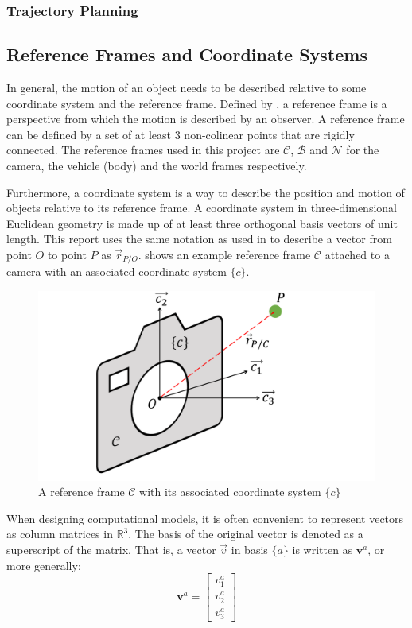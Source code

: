 \documentclass{UoNMCHA}
\numberwithin{equation}{section}
\begin{document}
\subsubsection{Trajectory Planning}

\subsection{Reference Frames and Coordinate Systems}\label{sec:ReferenceFrames}
In general, the motion of an object needs to be described relative to some coordinate system and the reference frame. Defined by \cite{3900Notes}, a reference frame is a perspective from which the motion is described by an observer. A reference frame can be defined by a set of at least 3 non-colinear points that are rigidly connected. The reference frames used in this project are $\mathcal{C}$, $\mathcal{B}$ and $\mathcal{N}$ for the camera, the vehicle (body) and the world frames respectively.

Furthermore, a coordinate system is a way to describe the position and motion of objects relative to its reference frame. A coordinate system in three-dimensional Euclidean geometry is made up of at least three orthogonal basis vectors of unit length. This report uses the same notation as used in \cite{3900Notes} to describe a vector from point $O$ to point $P$ as $\vec{r}_{P/O}$.  shows an example reference frame $\mathcal{C}$ attached to a camera with an associated coordinate system $\{c\}$.

\begin{figure}[ht]
    \begin{center}
        \includegraphics[width=.6\linewidth]{Figures/ReferenceFrame}
        \caption{A reference frame $\mathcal{C}$ with its associated coordinate system $\{c\}$}
        \label{fig:ReferenceFrame}
    \end{center}
\end{figure}

When designing computational models, it is often convenient to represent vectors as column matrices in $\mathbb{R}^3$. The basis of the original vector is denoted as a superscript of the matrix. That is, a vector $\vec{v}$ in basis $\{a\}$ is written as $\mathbf{v}^a$, or more generally: 
\begin{equation}
	\mathbf{v}^a = 
	\begin{bmatrix}
		v^{a}_1\\
		v^{a}_2\\
		v^{a}_3
	\end{bmatrix}
\end{equation}
\end{document}
